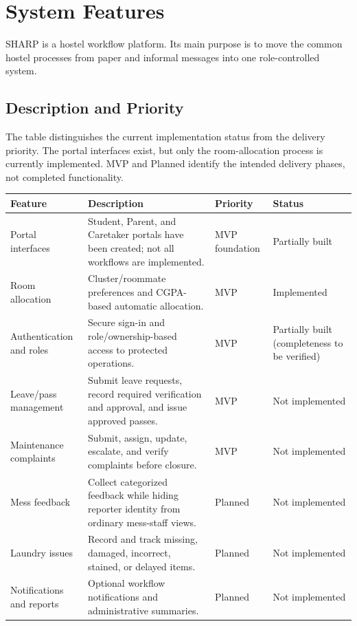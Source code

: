 \documentclass[11pt,a4paper]{article}
\numberwithin{figure}{section}   %
\begin{document}
\FloatBarrier
\section{System Features}
SHARP is a hostel workflow platform. Its main purpose is to move the common hostel processes from paper and informal messages into one role-controlled system.

\subsection{Description and Priority}
The table distinguishes the current implementation status from the delivery priority. The portal interfaces exist, but only the room-allocation process is currently implemented. MVP and Planned identify the intended delivery phases, not completed functionality.

\begin{longtable}{>{\raggedright\arraybackslash}p{}>{\raggedright\arraybackslash}p{}>{\raggedright\arraybackslash}p{}>{\raggedright\arraybackslash}p{}}
\toprule
\textbf{Feature} & \textbf{Description} & \textbf{Priority} & \textbf{Status}\\
\midrule
\endhead
Portal interfaces & Student, Parent, and Caretaker portals have been created; not all workflows are implemented. & MVP foundation & Partially built\\
Room allocation & Cluster/roommate preferences and CGPA-based automatic allocation. & MVP & Implemented\\
Authentication and roles & Secure sign-in and role/ownership-based access to protected operations. & MVP & Partially built (completeness to be verified)\\
Leave/pass management & Submit leave requests, record required verification and approval, and issue approved passes. & MVP & Not implemented\\
Maintenance complaints & Submit, assign, update, escalate, and verify complaints before closure. & MVP & Not implemented\\
Mess feedback & Collect categorized feedback while hiding reporter identity from ordinary mess-staff views. & Planned & Not implemented\\
Laundry issues & Record and track missing, damaged, incorrect, stained, or delayed items. & Planned & Not implemented\\
Notifications and reports & Optional workflow notifications and administrative summaries. & Planned & Not implemented\\
\bottomrule
\end{longtable}
\end{document}
